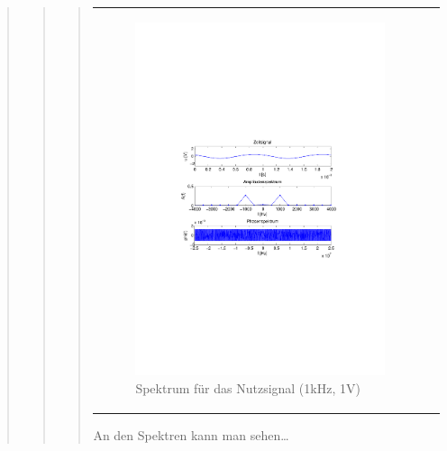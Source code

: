 \begin{quote}
\begin{quote}
\begin{quote}
\begin{center}
\begin{tabular}{ll}
\begin{minipage}{0.6\textwidth}
                     \begin{figure}[H]
                        \label{fig:}
                        \includegraphics[scale=0.5, trim = 2cm 6.5cm 1.5cm
                        8.5cm, clip]{./Bilder/spektrum_sin1kHz}
                        \caption{Spektrum für das Nutzsignal (1kHz, 1V)}
                    \end{figure}
               \vspace{-1.5em}

                \end{minipage}

            \end{tabular}
            \end{center}
        
        An den Spektren kann man sehen\ldots
        

\end{quote}
\end{quote}
\end{quote}
